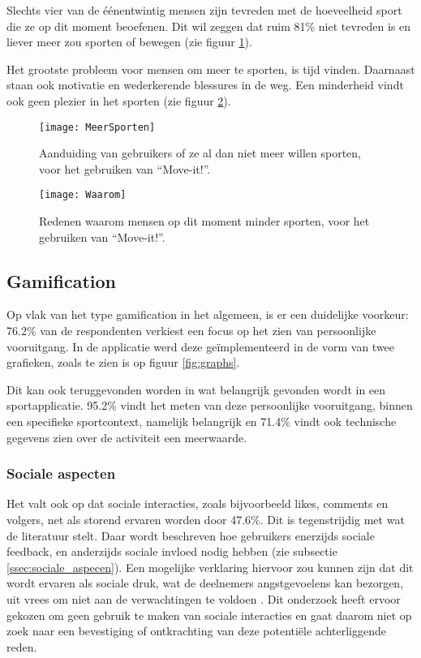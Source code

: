 Slechts vier van de éénentwintig mensen zijn tevreden met de hoeveelheid sport die ze op dit moment beoefenen. Dit wil zeggen dat ruim 81\% niet tevreden is en liever meer zou sporten of bewegen (zie figuur \ref{fig:meerBewegen}).

Het grootste probleem voor mensen om meer te sporten, is tijd vinden. Daarnaast staan ook motivatie en wederkerende blessures in de weg. Een minderheid vindt ook geen plezier in het sporten (zie figuur \ref{fig:waarom}).

\begin{figure}[h]
    \caption[Aanduiding van gebruikers of ze al dan niet meer willen sporten, voor het gebruiken van ``Move-it!'']{Aanduiding van gebruikers of ze al dan niet meer willen sporten, voor het gebruiken van ``Move-it!''.}
    \texttt{[image: MeerSporten]}
    \label{fig:meerBewegen}
\end{figure}

\begin{figure}[h]
    \caption[Redenen waarom mensen op dit moment minder sporten, voor het gebruiken van ``Move-it!'']{Redenen waarom mensen op dit moment minder sporten, voor het gebruiken van ``Move-it!''.}
    \texttt{[image: Waarom]}
    \label{fig:waarom}
\end{figure}

\subsection{Gamification}

Op vlak van het type gamification in het algemeen, is er een duidelijke voorkeur: 76.2\% van de respondenten verkiest een focus op het zien van persoonlijke vooruitgang. In de applicatie werd deze geïmplementeerd in de vorm van twee grafieken, zoals te zien is op figuur \ref{fig:graphs}.

Dit kan ook teruggevonden worden in wat belangrijk gevonden wordt in een sportapplicatie. 95.2\% vindt het meten van deze persoonlijke vooruitgang, binnen een specifieke sportcontext, namelijk belangrijk en 71.4\% vindt ook technische gegevens zien over de activiteit een meerwaarde.

\subsubsection{Sociale aspecten}

Het valt ook op dat sociale interacties, zoals bijvoorbeeld likes, comments en volgers, net als storend ervaren worden door 47.6\%. Dit is tegenstrijdig met wat de literatuur stelt. Daar wordt beschreven hoe gebruikers enerzijds sociale feedback, en anderzijds sociale invloed nodig hebben (zie subsectie \ref{ssec:sociale_aspecen}). Een mogelijke verklaring hiervoor zou kunnen zijn dat dit wordt ervaren als sociale druk, wat de deelnemers angstgevoelens kan bezorgen, uit vrees om niet aan de verwachtingen te voldoen \autocite{Jong2010}. Dit onderzoek heeft ervoor gekozen om geen gebruik te maken van sociale interacties en gaat daarom niet op zoek naar een bevestiging of ontkrachting van deze potentiële achterliggende reden.

